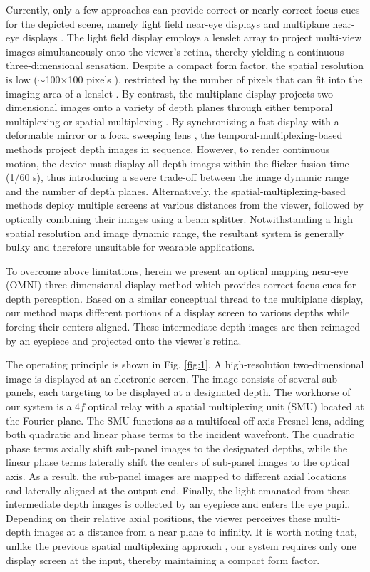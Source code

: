 \documentclass[9pt,twocolumn,twoside]{osajnl}
\begin{document}
Currently, only a few approaches can provide correct or nearly correct focus cues for the depicted scene, namely light field near-eye displays \cite{hu2014high} and multiplane near-eye displays \cite{hu2014design}. The light field display employs a lenslet array to project multi-view images simultaneously onto the viewer’s retina, thereby yielding a continuous three-dimensional sensation. Despite a compact form factor, the spatial resolution is low ($\sim$100×100 pixels \cite{hua20143d}), restricted by the number of pixels that can fit into the imaging area of a lenslet \cite{grzegorzek2013time}. By contrast, the multiplane display projects two-dimensional images onto a variety of depth planes through either temporal multiplexing \cite{llull2015design} or spatial multiplexing \cite{reichow2014three}. By synchronizing a fast display with a deformable mirror \cite{hu2014high} or a focal sweeping lens \cite{llull2015design}, the temporal-multiplexing-based methods project depth images in sequence. However, to render continuous motion, the device must display all depth images within the flicker fusion time (1/60 s), thus introducing a severe trade-off between the image dynamic range and the number of depth planes. Alternatively, the spatial-multiplexing-based methods deploy multiple screens at various distances from the viewer, followed by optically combining their images using a beam splitter. Notwithstanding a high spatial resolution and image dynamic range, the resultant system is generally bulky and therefore unsuitable for wearable applications.\par
To overcome above limitations, herein we present an optical mapping near-eye (OMNI) three-dimensional display method which provides correct focus cues for depth perception. Based on a similar conceptual thread to the multiplane display, our method maps different portions of a display screen to various depths while forcing their centers aligned. These intermediate depth images are then reimaged by an eyepiece and projected onto the viewer’s retina.\par
The operating principle is shown in Fig. \ref{fig:1}. A high-resolution two-dimensional image is displayed at an electronic screen. The image consists of several sub-panels, each targeting to be displayed at a designated depth. The workhorse of our system is a 4$f$ optical relay with a spatial multiplexing unit (SMU) located at the Fourier plane. The SMU functions as a multifocal off-axis Fresnel lens, adding both quadratic and linear phase terms to the incident wavefront. The quadratic phase terms axially shift sub-panel images to the designated depths, while the linear phase terms laterally shift the centers of sub-panel images to the optical axis. As a result, the sub-panel images are mapped to different axial locations and laterally aligned at the output end. Finally, the light emanated from these intermediate depth images is collected by an eyepiece and enters the eye pupil. Depending on their relative axial positions, the viewer perceives these multi-depth images at a distance from a near plane to infinity. It is worth noting that, unlike the previous spatial multiplexing approach \cite{hoffman2008vergence}, our system requires only one display screen at the input, thereby maintaining a compact form factor.\par
\end{document}
